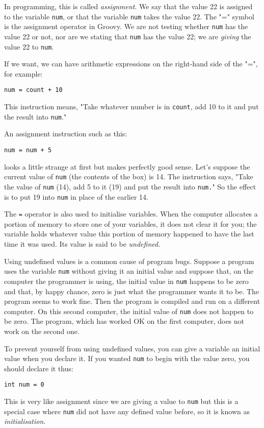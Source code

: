 In programming, this is called \emph{assignment}.  We say that the value 22 is
assigned to the variable \verb!num!, or that the variable \verb!num! takes the
value 22.  The "=" symbol is the assignment operator in Groovy.  We are not
testing whether \verb!num! has the value 22 or not, nor are we stating that
\verb!num! has the value 22; we are \emph{giving} the value 22 to \verb!num!.

If we want, we can have arithmetic expressions on the right-hand side of
the "=", for example:
\begin{Verbatim}
num = count + 10
\end{Verbatim}
This instruction means, "Take whatever number is in \verb!count!,
add 10 to it and put the result into \verb!num!."

An assignment instruction such as this:
\begin{Verbatim}
num = num + 5
\end{Verbatim}
looks a little strange at first but makes perfectly good sense.
Let's suppose the current value of \verb!num! (the contents of the box) is 14.
The instruction says, "Take the value of \verb!num!
(14), add 5 to it (19) and put the result into \verb!num.!"
So the effect is to put 19 into \verb!num! in place of the earlier 14.

The \verb!=! operator is also used to initialise variables.  When the computer
allocates a portion of memory to store one of your variables, it does not
clear it for you; the variable holds whatever value this portion of memory
happened to have the last time it was used.  Its value is said to be
\emph{undefined.}

Using undefined values is a common cause of program
bugs.  Suppose a program uses the variable \verb!num! without giving it an
initial value and suppose that, on the computer the programmer is using,
the initial value in \verb!num! happens to be zero and that, by happy chance,
zero is just what the programmer wants it to be.
The program seems to work fine.  Then the program is compiled and run on
a different computer.  On this second computer, the initial value of \verb!num!
does not happen to be zero.  The program, which has worked OK on the first
computer, does not work on the second one.

To prevent yourself from using undefined values, you can give a variable
an initial value when you declare it.  If you wanted \verb!num! to begin
with the value zero, you should declare it thus:
\begin{Verbatim}
int num = 0
\end{Verbatim}
This is very like assignment since we are giving a value to \verb!num! but
this is a special case where \verb!num! did not have any defined value before,
so it is known as \emph{initialisation.}

